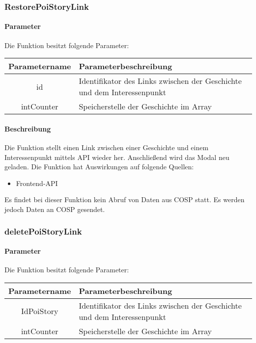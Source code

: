 \subsubsection{RestorePoiStoryLink}
\paragraph{Parameter} Die Funktion besitzt folgende Parameter:
\begin{table}[H]
	\begin{tabular}{|c|p{11cm}|}
		\hline
		\textbf{Parametername} & \textbf{Parameterbeschreibung} \\ \hline
		id         & Identifikator des Links zwischen der Geschichte und dem Interessenpunkt \\ \hline
		intCounter & Speicherstelle der Geschichte im Array \\ \hline
	\end{tabular}
\end{table}
\paragraph{Beschreibung} Die Funktion stellt einen Link zwischen einer Geschichte und einem Interessenpunkt mittels API wieder her. Anschließend wird das Modal neu geladen. Die Funktion hat Auswirkungen auf folgende Quellen:
\begin{itemize}
	\item Frontend-API
\end{itemize}
Es findet bei dieser Funktion kein Abruf von Daten aus {\glqq COSP\grqq} statt. Es werden jedoch Daten an {\glqq COSP\grqq} gesendet.
\subsubsection{deletePoiStoryLink}
\paragraph{Parameter} Die Funktion besitzt folgende Parameter:
\begin{table}[H]
	\begin{tabular}{|c|p{11cm}|}
		\hline
		\textbf{Parametername} & \textbf{Parameterbeschreibung} \\ \hline
		IdPoiStory & Identifikator des Links zwischen der Geschichte und dem Interessenpunkt \\ \hline
		intCounter & Speicherstelle der Geschichte im Array \\ \hline
	\end{tabular}
\end{table}

